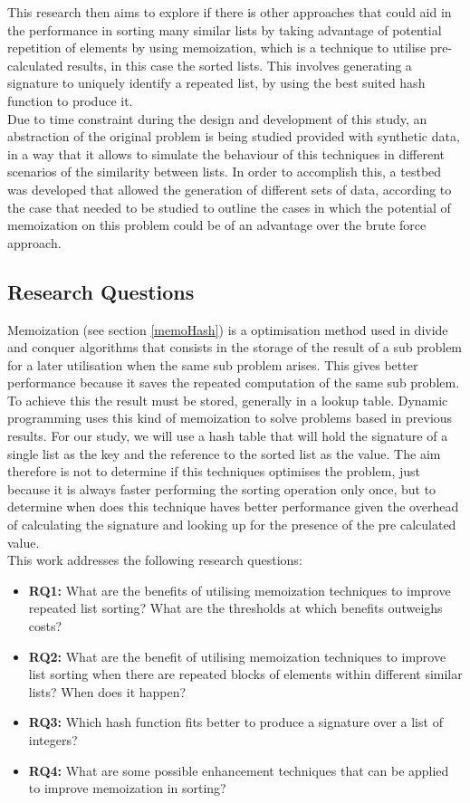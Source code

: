 \documentclass[a4paper,12pt]{article}
\begin{document}
This research then aims to explore if there is other approaches that could aid in the performance in sorting many similar lists by taking advantage of potential repetition of elements by using memoization, which is a technique to utilise pre-calculated results, in this case the sorted lists. This involves generating a signature to uniquely identify a repeated list, by using the best suited hash function to produce it.
\\

Due to time constraint during the design and development of this study, an abstraction of the original problem is being studied provided with synthetic data, in a way that it allows to simulate the behaviour of this techniques in different scenarios of the similarity between lists. In order to accomplish this, a testbed was developed that allowed the generation of different sets of data, according to the case that needed to be studied to outline the cases in which the potential of memoization on this problem could be of an advantage over the brute force approach.

\subsection*{Research Questions}  \label{researchQuestions}
Memoization (see section \ref{memoHash}) is a optimisation method used in divide and conquer algorithms that consists in the storage of the result of a sub problem for a later utilisation when the same sub problem arises. This gives better performance because it saves the repeated computation of the same sub problem. To achieve this the result must be stored, generally in a lookup table. Dynamic programming uses this kind of memoization to solve problems based in previous results. For our study, we will use a hash table that will hold the signature of a single list as the key and the reference to the sorted list as the value. The aim therefore is not to determine if this techniques optimises the problem, just because it is always faster performing the sorting operation only once, but to determine when does this technique haves better performance given the overhead of calculating the signature and looking up for the presence of the pre calculated value.\\

This work addresses the following research questions:

\begin{itemize}
\item {\bf RQ1:} What are the benefits of utilising memoization techniques to improve repeated list sorting? What are the thresholds at which benefits outweighs costs?
\item {\bf RQ2:} What are the benefit of utilising memoization techniques to improve list sorting when there are repeated blocks of elements within different similar lists? When does it happen?
\item {\bf RQ3:} Which hash function fits better to produce a signature over a list of integers?
\item {\bf RQ4:} What are some possible enhancement techniques that can be applied to improve memoization in sorting?
\end{itemize}
\end{document}
